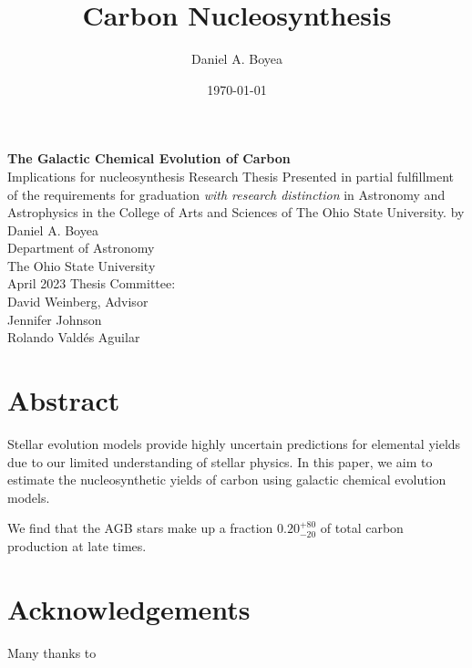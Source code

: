 \documentclass[12pt,oneside]{book}
\title{Carbon Nucleosynthesis}
\author{Daniel A. Boyea}
\date{\today}
\begin{document}

\begin{titlepage}
   \begin{center}
       \vfill
       \textbf{The Galactic Chemical Evolution of Carbon} \\
        Implications for nucleosynthesis
        \vfill
        Research Thesis
        \vfill
        Presented in partial fulfillment of the requirements for graduation \textit{with research distinction} in Astronomy and Astrophysics in the College of Arts and Sciences of The Ohio State University.
        \vfill
        by 
        \vfill
       {Daniel A. Boyea}\\
       \vfill
       Department of Astronomy\\
       The Ohio State University\\
       \vfill
       April 2023
       \vfill
       Thesis Committee:\\
       David Weinberg, Advisor \\
       Jennifer Johnson \\
       Rolando Vald\'es Aguilar\\
       \vfill
            
   \end{center}
\end{titlepage}



\chapter*{Abstract}
\begin{center}
Stellar evolution models provide highly uncertain predictions for elemental yields due to our limited understanding of stellar physics. In this paper, we aim to estimate the nucleosynthetic yields of carbon using galactic chemical evolution models. 

We find that the AGB stars make up a fraction $0.20_{-20}^{+80}$ of total carbon production at late times. 
\end{center}

\chapter*{Acknowledgements}

Many thanks to




\tableofcontents
\listoffigures
\listoftables
\newpage
{}
\end{document}
